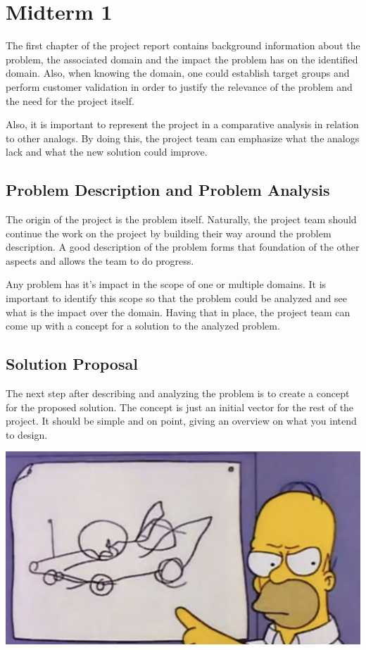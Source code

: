 \chapter{Midterm 1}

The first chapter of the project report contains background information about the problem, the associated domain and the impact the problem has on the identified domain. 
Also, when knowing the domain, one could establish target groups and perform customer validation in order to justify the relevance of the problem and the need for the project itself. \cite{chicago}

Also, it is important to represent the project in a comparative analysis in relation to other analogs. 
By doing this, the project team can emphasize what the analogs lack and what the new solution could improve.


\section{Problem Description and Problem Analysis}

The origin of the project is the problem itself. 
Naturally, the project team should continue the work on the project by building their way around the problem description. 
A good description of the problem forms that foundation of the other aspects and allows the team to do progress.

Any problem has it's impact in the scope of one or multiple domains.
It is important to identify this scope so that the problem could be analyzed and see what is the impact over the domain. 
Having that in place, the project team can come up with a concept for a solution to the analyzed problem. \cite{chicago}


\section{Solution Proposal}

The next step after describing and analyzing the problem is to create a concept for the proposed solution. 
The concept is just an initial vector for the rest of the project. 
It should be simple and on point, giving an overview on what you intend to design.
\vspace{0.5cm}

{ \centering \includegraphics[width=\textwidth]{images/concept.png} }

